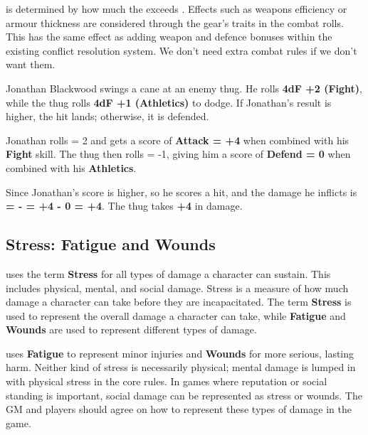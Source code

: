 \Damage is determined by how much the \Attack exceeds \Defend. Effects such as weapons efficiency or armour thickness are considered through the gear's traits in the combat rolls. This has the same effect as adding weapon and defence bonuses within the existing conflict resolution system. We don't need extra combat rules if we don't want them.

\begin{Example}
	Jonathan Blackwood swings a cane at an enemy thug. He rolls \textbf{4dF +2 (Fight)}, while the thug rolls \textbf{4dF +1 (Athletics)} to dodge. If Jonathan’s result is higher, the hit lands; otherwise, it is defended.
	
	Jonathan rolls \FudgeRes{+++-} = 2 and gets a score of \textbf{Attack = +4} when combined with his \textbf{Fight} skill. The thug then rolls  = -1, giving him a score of \textbf{Defend = 0} when combined with his \textbf{Athletics}.
	
	Since Jonathan's score is higher, so he scores a hit, and the damage he inflicts is \textbf{\Damage = \Attack - \Defend = +4 - 0 = +4}. The thug takes \textbf{+4} in damage.
\end{Example}


\subsection{Stress: Fatigue  and Wounds}

\wyrd uses the term \textbf{Stress} for all types of damage a character can sustain. This includes physical, mental, and social damage. Stress is a measure of how much damage a character can take before they are incapacitated. The term \textbf{Stress} is used to represent the overall damage a character can take, while \textbf{Fatigue} and \textbf{Wounds} are used to represent different types of damage.

\wyrd uses \textbf{Fatigue} to represent minor injuries and \textbf{Wounds} for more serious, lasting harm. Neither kind of stress is necessarily physical; mental damage is lumped in with physical stress in the core rules. In games where reputation or social standing is important, social damage can be represented as stress or wounds. The GM and players should agree on how to represent these types of damage in the game.

